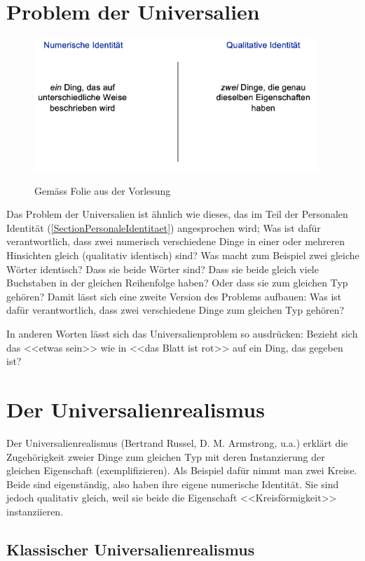 \documentclass[../main.tex]{subfiles}
\begin{document}
\section{Problem der Universalien}
\begin{figure}[!htb]
\centering
{\centering\includegraphics[height=5cm]{images/numerische_und_qualitative_identitaet.png}\endcenter}
\caption{Gemäss Folie aus der Vorlesung}
\end{figure}


Das Problem der Universalien ist ähnlich wie dieses, das im Teil der Personalen Identität (\ref{SectionPersonaleIdentitaet}) angesprochen wird; Was ist dafür verantwortlich, dass zwei numerisch verschiedene Dinge in einer oder mehreren Hinsichten gleich (qualitativ identisch) sind? Was macht zum Beispiel zwei gleiche Wörter identisch? Dass sie beide Wörter sind? Dass sie beide gleich viele Buchstaben in der gleichen Reihenfolge haben? Oder dass sie zum gleichen Typ gehören? Damit lässt sich eine zweite Version des Problems aufbauen: Was ist dafür verantwortlich, dass zwei verschiedene Dinge zum gleichen Typ gehören?

In anderen Worten lässt sich das Universalienproblem so ausdrücken: Bezieht sich das <<etwas sein>> wie in <<das Blatt ist rot>> auf ein Ding, das gegeben ist?

\section{Der Universalienrealismus}
Der Universalienrealismus (Bertrand Russel, D. M. Armstrong, u.a.) erklärt die Zugehörigkeit zweier Dinge zum gleichen Typ mit deren Instanzierung der gleichen Eigenschaft (exemplifizieren). Als Beispiel dafür nimmt man zwei Kreise. Beide sind eigenständig, also haben ihre eigene numerische Identität. Sie sind jedoch qualitativ gleich, weil sie beide die Eigenschaft <<Kreisförmigkeit>> instanziieren. 

\subsection{Klassischer Universalienrealismus}
\end{document}
